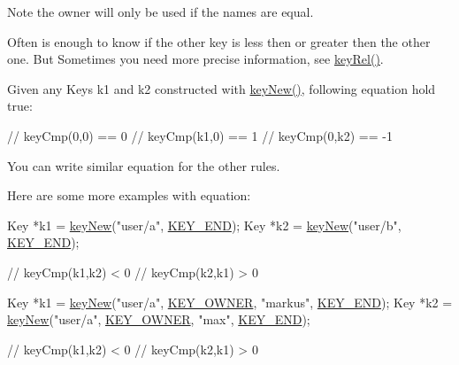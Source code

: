 \begin{DoxyNote}{Note}
the owner will only be used if the names are equal.
\end{DoxyNote}
Often is enough to know if the other key is less then or greater then the other one. But Sometimes you need more precise information, see \hyperlink{group__keytest_ga6bb0f95ac34ce9c42d61bb35a76139d0}{key\-Rel()}.

Given any Keys k1 and k2 constructed with \hyperlink{group__key_gad23c65b44bf48d773759e1f9a4d43b89}{key\-New()}, following equation hold true\-:


\begin{DoxyCode}
\textcolor{comment}{// keyCmp(0,0) == 0}
\textcolor{comment}{// keyCmp(k1,0) ==  1}
\textcolor{comment}{// keyCmp(0,k2) == -1}
\end{DoxyCode}


You can write similar equation for the other rules.

Here are some more examples with equation\-: 
\begin{DoxyCode}
Key *k1 = \hyperlink{group__key_gad23c65b44bf48d773759e1f9a4d43b89}{keyNew}(\textcolor{stringliteral}{"user/a"}, \hyperlink{group__key_gga91fb3178848bd682000958089abbaf40aa8adb6fcb92dec58fb19410eacfdd403}{KEY\_END});
Key *k2 = \hyperlink{group__key_gad23c65b44bf48d773759e1f9a4d43b89}{keyNew}(\textcolor{stringliteral}{"user/b"}, \hyperlink{group__key_gga91fb3178848bd682000958089abbaf40aa8adb6fcb92dec58fb19410eacfdd403}{KEY\_END});

\textcolor{comment}{// keyCmp(k1,k2) < 0}
\textcolor{comment}{// keyCmp(k2,k1) > 0}
\end{DoxyCode}



\begin{DoxyCode}
Key *k1 = \hyperlink{group__key_gad23c65b44bf48d773759e1f9a4d43b89}{keyNew}(\textcolor{stringliteral}{"user/a"}, \hyperlink{group__key_gga91fb3178848bd682000958089abbaf40a77ca60362fa8daca8d5347db4385068b}{KEY\_OWNER}, \textcolor{stringliteral}{"markus"}, \hyperlink{group__key_gga91fb3178848bd682000958089abbaf40aa8adb6fcb92dec58fb19410eacfdd403}{KEY\_END});
Key *k2 = \hyperlink{group__key_gad23c65b44bf48d773759e1f9a4d43b89}{keyNew}(\textcolor{stringliteral}{"user/a"}, \hyperlink{group__key_gga91fb3178848bd682000958089abbaf40a77ca60362fa8daca8d5347db4385068b}{KEY\_OWNER}, \textcolor{stringliteral}{"max"}, \hyperlink{group__key_gga91fb3178848bd682000958089abbaf40aa8adb6fcb92dec58fb19410eacfdd403}{KEY\_END});

\textcolor{comment}{// keyCmp(k1,k2) < 0}
\textcolor{comment}{// keyCmp(k2,k1) > 0}
\end{DoxyCode}


